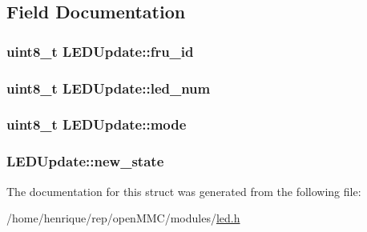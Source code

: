 \subsection{Field Documentation}
\hypertarget{structLEDUpdate_ac4d77b89c3a28822b37bf6bb6a236f90}{
\subsubsection[{fru\-\_\-id}]{\setlength{\rightskip}{0pt plus 5cm}uint8\-\_\-t L\-E\-D\-Update\-::fru\-\_\-id}}\label{structLEDUpdate_ac4d77b89c3a28822b37bf6bb6a236f90}
\hypertarget{structLEDUpdate_abdb660f38389b489270c6c2ecdbfb1e9}{
\subsubsection[{led\-\_\-num}]{\setlength{\rightskip}{0pt plus 5cm}uint8\-\_\-t L\-E\-D\-Update\-::led\-\_\-num}}\label{structLEDUpdate_abdb660f38389b489270c6c2ecdbfb1e9}
\hypertarget{structLEDUpdate_a8760f2c925c2634a4e057379e62a9d87}{
\subsubsection[{mode}]{\setlength{\rightskip}{0pt plus 5cm}uint8\-\_\-t L\-E\-D\-Update\-::mode}}\label{structLEDUpdate_a8760f2c925c2634a4e057379e62a9d87}
\hypertarget{structLEDUpdate_a75c77e31f8b621e98f247830fefd6926}{
\subsubsection[{new\-\_\-state}]{ L\-E\-D\-Update\-::new\-\_\-state}}\label{structLEDUpdate_a75c77e31f8b621e98f247830fefd6926}


The documentation for this struct was generated from the following file\-:\begin{DoxyCompactItemize}
\item 
/home/henrique/rep/open\-M\-M\-C/modules/\hyperlink{led_8h}{led.\-h}\end{DoxyCompactItemize}

